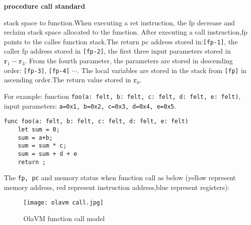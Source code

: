 \textbf{procedure call standard}

stack space to function.When executing a ret instruction, the fp decrease and reclaim stack space allocated to the function.
After executing a call instruction,fp points to the callee function stack.The return pc address stored in:\texttt{[fp-1]}, the caller fp address stored in \texttt{[fp-2]}, the first three input parameters stored in $\texttt{r}_1 - \texttt{r}_{3}$.
From the fourth parameter, the parameters are stored in descending order: \texttt{[fp-3]}, \texttt{[fp-4]} $\cdots$.
The local variables are stored in the stack from \texttt{[fp]} in ascending order.The return value stored in $\texttt{r}_0$.

For example: function \texttt{foo(a: felt, b: felt, c: felt, d: felt, e: felt)}, input parameters: \texttt{a=0x1, b=0x2, c=0x3, d=0x4, e=0x5}.
\begin{lstlisting}[label={lst:function_call}]
func foo(a: felt, b: felt, c: felt, d: felt, e: felt)
    let sum = 0;
    sum = a+b;
    sum = sum * c;
    sum = sum + d + e
    return ;
\end{lstlisting}

The \texttt{fp, pc} and memory status when function call as below (yellow represent memory address, red represent instruction address,blue represent registers):
\begin{figure}[!htp]
    \centering
    \texttt{[image: olavm call.jpg]}
    \caption{OlaVM function call model}
    \label{fig:processor call}
\end{figure}
